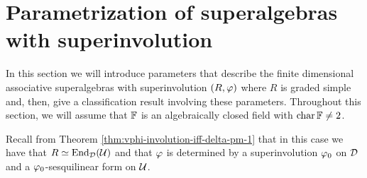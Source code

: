





\section{Parametrization of superalgebras with superinvolution}

In this section we will introduce parameters that describe the finite dimensional associative superalgebras with superinvolution $(R, \varphi)$ where $R$ is graded simple and, then, give a classification result involving these parameters. 
Throughout this section, we will assume that $\mathbb{F}$ is an algebraically closed field with $\operatorname{char} \mathbb{F} \neq 2$.

Recall from Theorem \ref{thm:vphi-involution-iff-delta-pm-1} that in this case we have that $R \simeq \operatorname{End}_{\mathcal{D}} (\mathcal U)$ and that $\varphi$ is determined by a superinvolution $\varphi_0$ on $\mathcal{D}$ and a $\varphi_0$-sesquilinear form on $\mathcal U$.

